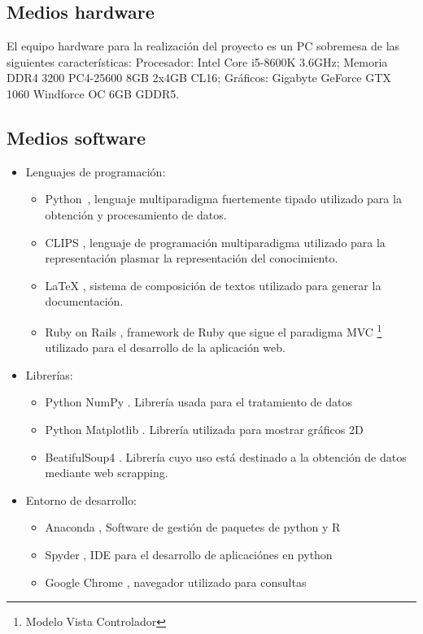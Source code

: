 \documentclass[11pt,a4paper,twoside,final]{article}
\begin{document}
\subsection{Medios hardware}
El equipo hardware para la realización del proyecto es un PC sobremesa de las siguientes características: Procesador: Intel Core i5-8600K 3.6GHz; Memoria DDR4 3200 PC4-25600 8GB 2x4GB CL16; Gráficos: Gigabyte GeForce GTX 1060 Windforce OC 6GB GDDR5.
\subsection{Medios software}
\begin{itemize}
    \item Lenguajes de programación:
    \begin{itemize}
        \item Python~\cite{python}, lenguaje multiparadigma fuertemente tipado utilizado para la obtención y procesamiento de datos.
        \item CLIPS \cite{clips}, lenguaje de programación multiparadigma utilizado para la representación plasmar la representación del conocimiento.
        \item LaTeX \cite{latex}, sistema de composición de textos utilizado para generar la documentación.
        \item Ruby on Rails \cite{ror}, framework de Ruby que sigue el paradigma MVC \footnote{Modelo Vista Controlador} utilizado para el desarrollo de la aplicación web.
    \end{itemize}
    \item Librerías:
    \begin{itemize}
        \item Python NumPy \cite{numpy}. Librería usada para el tratamiento de datos
        \item Python Matplotlib \cite{matplotlib}. Librería utilizada para mostrar gráficos 2D
        \item BeatifulSoup4 \cite{beatifulsoup}. Librería cuyo uso está destinado a la obtención de datos mediante web scrapping.
    \end{itemize}
    \item Entorno de desarrollo:
    \begin{itemize}
        \item Anaconda \cite{anaconda}, Software de gestión de paquetes de python y R
        \item Spyder \cite{spyder}, IDE para el desarrollo de aplicaciónes en python
        \item Google Chrome \cite{chrome}, navegador utilizado para consultas

\end{itemize}
\end{itemize}
\end{document}
